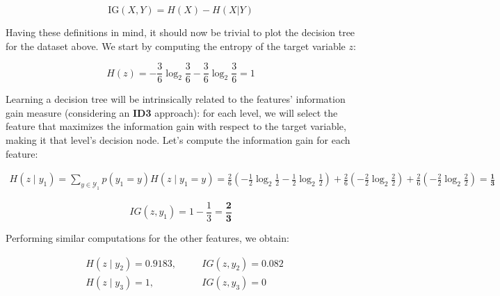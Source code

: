 \documentclass[12pt]{article}
\begin{document}
\begin{enumerate}[leftmargin=\labelsep]
        \begin{equation*}
          \text{IG}(X, Y) = H(X) - H(X|Y)
        \end{equation*}

        Having these definitions in mind, it should now be trivial to plot the decision tree
        for the dataset above. We start by computing the entropy of the target variable $z$:

        \begin{equation*}
          H(z) = -\frac{3}{6} \log_2 \frac{3}{6} - \frac{3}{6} \log_2 \frac{3}{6} = 1
        \end{equation*}

        Learning a decision tree will be intrinsically related to the features' information gain
        measure (considering an \textbf{ID3} approach): for each level, we will select the feature that maximizes the information gain
        with respect to the target variable, making it that level's decision node.
        Let's compute the information gain for each feature:

        \begin{equation*}
          \begin{aligned}
            H(z \mid y_1) = \sum_{y \in \mathcal{Y}_1} p(y_1 = y) H(z \mid y_1 = y)
            = \frac{2}{6} \left(-\frac{1}{2} \log_2 \frac{1}{2} - \frac{1}{2} \log_2 \frac{1}{2}\right)
            + \frac{2}{6} \left(-\frac{2}{2} \log_2 \frac{2}{2}\right)
            + \frac{2}{6} \left(-\frac{2}{2} \log_2 \frac{2}{2}\right)
            = \mathbf{\frac{1}{3}}
          \end{aligned}
        \end{equation*}

        \begin{equation*}
          IG(z, y_1)    = 1 - \frac{1}{3} = \mathbf{\frac{2}{3}}
        \end{equation*}

        Performing similar computations for the other features, we obtain:

        \begin{equation*}
          \begin{aligned}
             & H(z \mid y_2) = 0.9183, \quad &  & IG(z, y_2) = 0.082 \\
             & H(z \mid y_3) = 1, \quad      &  & IG(z, y_3) = 0
          \end{aligned}
        \end{equation*}


\end{enumerate}
\end{document}
